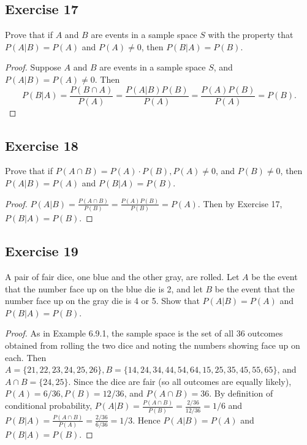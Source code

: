 \documentclass[14pt]{extarticle}
\begin{document}
\subsection{Exercise 17}
Prove that if \(A\) and \(B\) are events in a sample space \(S\) with the property that \(P(A|B) = P(A)\) and
\(P(A) \neq 0\), then \(P(B|A) = P(B)\).

\begin{proof}
     Suppose \(A\) and \(B\) are events in a sample space \(S\), and \(P(A|B) = P(A) \neq 0\). Then
     \[
          P(B|A) = \frac{P(B\cap A)}{P(A)} = \frac{P(A|B)P(B)}{P(A)} = \frac{P(A)P(B)}{P(A)} = P(B).
     \]
\end{proof}

\subsection{Exercise 18}
Prove that if \(P(A \cap B) = P(A) \cdot P(B), P(A) \neq 0\), and \(P(B) \neq 0\), then \(P(A|B) = P(A)\) and
\(P(B|A) = P(B)\).

\begin{proof}
     \(P(A|B) = \frac{P(A \cap B)}{P(B)} = \frac{P(A)P(B)}{P(B)} = P(A)\). Then by Exercise 17, \(P(B|A) = P(B)\).
\end{proof}

\subsection{Exercise 19}
A pair of fair dice, one blue and the other gray, are rolled. Let \(A\) be the event that the number face up on the blue die
is 2, and let \(B\) be the event that the number face up on the gray die is 4 or 5. Show that \(P(A|B) = P(A)\) and
\(P(B|A) = P(B)\).

\begin{proof}
     As in Example 6.9.1, the sample space is the set of all 36 outcomes obtained from rolling the two dice and noting the
     numbers showing face up on each. Then \(A = \{21, 22, 23, 24, 25, 26\}, B = \{14, 24, 34, 44, 54, 64, 15, 25, 35, 45, 55,
     65\}\), and \(A \cap B = \{24, 25\}\). Since the dice are fair (so all outcomes are equally likely), \(P(A) = 6/36, P(B) =
     12/36\), and \(P(A \cap B) = 36\). By definition of conditional probability, \(P(A|B) = \frac{P(A \cap B)}{P(B)} =
     \frac{2/36}{12/36} = 1/6\) and \(P(B|A) = \frac{P(A \cap B)}{P(A)} = \frac{2/36}{6/36} = 1/3\). Hence \(P(A|B) = P(A)\)
     and \(P(B|A) = P(B)\).
\end{proof}
\end{document}
